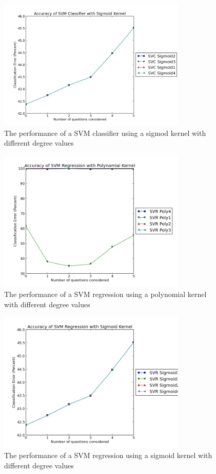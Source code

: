 \begin{figure}[h!]
\centering
\includegraphics[width=0.8\textwidth]{images/svcsigmoid.png}
\caption{The performance of a SVM classifier using a sigmod kernel with different degree values}
\label{fig:svcsigmoid}
\end{figure}

\begin{figure}[h!]
\centering
\includegraphics[width=0.8\textwidth]{images/svrpoly.png}
\caption{The performance of a SVM regression using a polynomial kernel with different degree values}
\label{fig:svrpoly}
\end{figure}

\begin{figure}[h!]
\centering
\includegraphics[width=0.8\textwidth]{images/svrsigmoid.png}
\caption{The performance of a SVM regression using a sigmoid kernel with different degree values}
\label{fig:svrsigmoid}
\end{figure}

